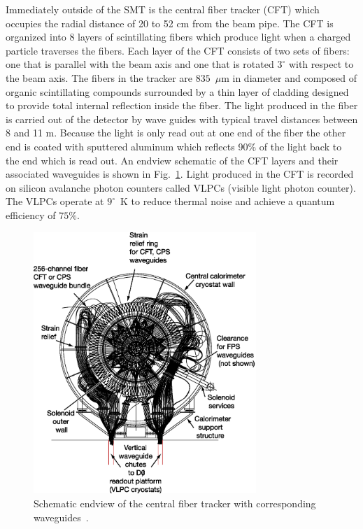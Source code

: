 Immediately outside of the SMT is the central fiber tracker (CFT) which occupies the radial distance of 20 to 52 cm from the beam pipe. The CFT is organized into 8 layers of scintillating fibers which produce light when a charged particle traverses the fibers. Each layer of the CFT consists of two sets of fibers: one that is parallel with the beam axis and one that is rotated $3^{\circ}$ with respect to the beam axis. 
The fibers in the tracker are $835$~$\mu$m in diameter and composed of organic scintillating compounds surrounded by a thin layer of cladding designed to provide total internal reflection inside the fiber. The light produced in the fiber is carried out of the detector by wave guides with typical travel distances between 8 and 11 m. Because the light is only read out at one end of the fiber the other end is coated with sputtered aluminum which reflects 90$\%$ of the light back to the end which is read out. An endview schematic of the CFT layers and their associated waveguides is shown in Fig.~\ref{CFT}.  Light produced in the CFT is recorded on silicon avalanche photon counters called VLPCs (visible light photon counter). The VLPCs operate at $9^{\circ}$~K to reduce thermal noise and achieve a quantum efficiency of $75\%$.

\begin{figure}[!h!tbp]
\begin{center}
\includegraphics[width=0.75\textwidth]{eps/D0/CFT.eps}
\end{center}
\vspace{-0.1in}
\caption{Schematic endview of the central fiber tracker with corresponding waveguides~\cite{Abazov:2005pn}.}
\label{CFT}
\end{figure}

